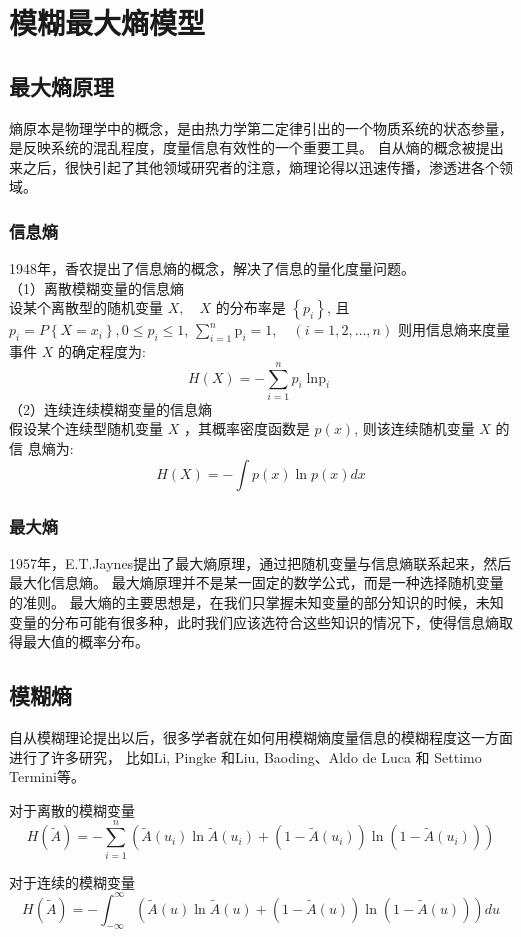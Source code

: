 \chapter[模糊最大熵模型]{模糊最大熵模型}
\section{最大熵原理}
熵原本是物理学中的概念，是由热力学第二定律引出的一个物质系统的状态参量，是反映系统的混乱程度，度量信息有效性的一个重要工具。
自从熵的概念被提出来之后，很快引起了其他领域研究者的注意，熵理论得以迅速传播，渗透进各个领域。
\subsection{信息熵}
1948年，香农\cite{1948A}提出了信息熵的概念，解决了信息的量化度量问题。\\
（1）离散模糊变量的信息熵\\
设某个离散型的随机变量 $X, \quad X$ 的分布率是 $\left\{p_{i}\right\}$, 且 $p_{i}=P\left\{X=x_{i}\right\}, 0 \leq p_{i} \leq 1$,
$\sum_{i=1}^n \mathrm{p}_i=1, \quad(i=1,2 ,\dots, n)$ 则用信息熵来度量事件 $X$ 的确定程度为:
\begin{equation}
    H(X) =-\sum_{i=1}^{n} p_{i} \operatorname{\ln p}_{i}
\end{equation}
（2）连续连续模糊变量的信息熵\\
假设某个连续型随机变量 $X$ ，其概率密度函数是 $p(x)$, 则该连续随机变量 $X$ 的信
息熵为:
\begin{equation}
    H(X)=-\int p(x) \ln p(x) d x
\end{equation}

\subsection{最大熵}
1957年，E.T.Jaynes提出了最大熵原理，通过把随机变量与信息熵联系起来，然后最大化信息熵。
最大熵原理并不是某一固定的数学公式，而是一种选择随机变量的准则。
最大熵的主要思想是，在我们只掌握未知变量的部分知识的时候，未知变量的分布可能有很多种，此时我们应该选符合这些知识的情况下，使得信息熵取得最大值的概率分布。

\section{模糊熵}
自从模糊理论提出以后，很多学者就在如何用模糊熵度量信息的模糊程度这一方面进行了许多研究，
比如Li, Pingke 和Liu, Baoding\cite{li2008entropy}、Aldo de Luca 和 Settimo Termini\cite{RN3}等。
\begin{definition}[模糊熵]
    对于离散的模糊变量
    \begin{equation}
        H(\tilde{A})=-\sum_{i=1}^{n}\left(\tilde{A}(u_i) \ln \tilde{A}(u_i)+\left(1-\tilde{A}(u_i)\right) \ln \left(1-\tilde{A}(u_i)\right)\right)
    \end{equation}

    对于连续的模糊变量
    \begin{equation}
        H(\tilde{A})=-\int_{-\infty}^{\infty}(\tilde{A}(u) \ln \tilde{A}(u)+(1-\tilde{A}(u)) \ln (1-\tilde{A}(u))) d u
    \end{equation}

\end{definition}

